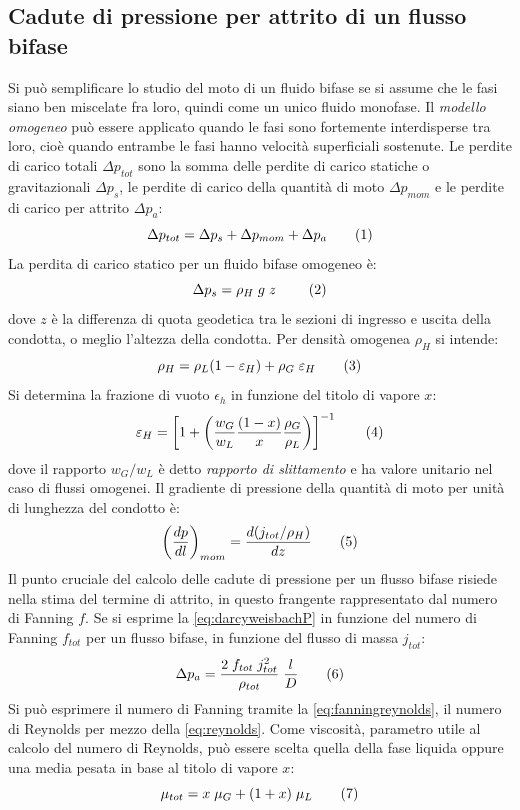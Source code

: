 \subsection{Cadute di pressione per attrito di un flusso bifase}
Si può semplificare lo studio del moto di un fluido bifase se si assume che le fasi siano ben miscelate fra loro, quindi come un unico fluido monofase. Il \textit{modello omogeneo} può essere applicato quando le fasi sono fortemente interdisperse tra loro, cioè quando entrambe le fasi hanno velocità superficiali sostenute. Le perdite di carico totali \(\Delta p_{tot}\) sono la somma delle perdite di carico statiche o gravitazionali \(\Delta p_s\), le perdite di carico della quantità di moto \(\Delta p_{mom}\) e le perdite di carico per attrito \(\Delta p_a\): 
\[\Delta p_{tot} = \Delta p_s +\Delta p_{mom} + \Delta p_a \addtag \label{eq:perditetot}\]
La perdita di carico statico per un fluido bifase omogeneo è:
\[\Delta p_s = \rho_H \; g \; z\ \addtag \]
dove \(z\) è la differenza di quota geodetica tra le sezioni di ingresso e uscita della condotta, o meglio l'altezza della condotta. Per densità omogenea \(\rho_H\) si intende:
\[\rho_H=\rho_L(1-\epsilon_H)+\rho_G \; \epsilon_H \addtag \label{eq:omogenea} \]
Si determina la frazione di vuoto \(\epsilon_h\) in funzione del titolo di vapore \(x\):
\[\epsilon_H = \left[ 1+ \left( \dfrac{w_G}{w_L} \dfrac{(1-x)}{x} \dfrac{\rho_G}{\rho_L} \right) \right]^{-1} \addtag \]
dove il rapporto \(w_G/w_L\) è detto \textit{rapporto di slittamento} e ha valore unitario nel caso di flussi omogenei. Il gradiente di pressione della quantità di moto per unità di lunghezza del condotto è:
\[\left( \dfrac{dp}{dl} \right)_{mom}=\dfrac{d(j_{tot}/\rho_H)}{dz} \addtag \]
Il punto cruciale del calcolo delle cadute di pressione per un flusso bifase risiede nella stima del termine di attrito, in questo frangente rappresentato dal numero di Fanning \(f\). Se si esprime la \eqref{eq:darcyweisbachP} in funzione del numero di Fanning \(f_{tot}\) per un flusso bifase, in funzione del flusso di massa \(j_{tot}\):
\[\Delta p_a = \dfrac{2 \; f_{tot} \; j_{tot}^2}{\rho_{tot}} \; \dfrac{l}{D} \addtag \label{eq:darcyweisbachfanning2f} \]
Si può esprimere il numero di Fanning tramite la \eqref{eq:fanningreynolds}, il numero di Reynolds per mezzo della \eqref{eq:reynolds}. Come viscosità, parametro utile al calcolo del numero di Reynolds, può essere scelta quella della fase liquida oppure una media pesata in base al titolo di vapore \(x\):
\[\mu_{tot} =x \; \mu_G + (1+x) \; \mu_L \addtag \]

